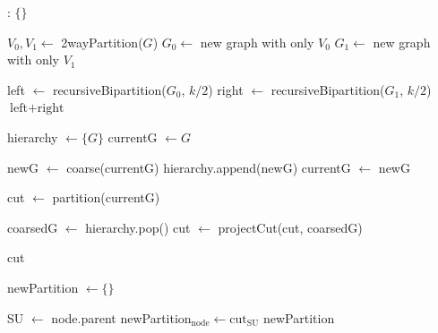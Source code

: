 \documentclass{article}
\begin{document}
\begin{algorithm}
\caption{RB}
\begin{algorithmic}
        :
            \State \Return $\{\}$
        \EndIf
    
        \State $V_0, V_1 \gets$  2wayPartition($G$)
        \State $G_0 \gets$ new graph with only $V_0$
        \State $G_1 \gets$ new graph with only $V_1$

        \State left $\gets$ recursiveBipartition($G_0$, $k/2$)
        \State right $\gets$ recursiveBipartition($G_1$, $k/2$)
        \State \Return $\text{left} + \text{right}$
    \EndFunction
    \Statex

        \State hierarchy $\gets \{G\}$
        \State currentG $\gets G$

            
            \State newG $\gets$ coarse(currentG)
            \State hierarchy.append(newG)
            \State currentG $\gets$ newG
        \EndWhile
        \Statex
    
        \State cut $\gets$ partition(currentG)
        \Statex
        
            \State coarsedG $\gets$ hierarchy.pop()
            \State cut $\gets$ projectCut(cut, coarsedG)
        \EndWhile

        \State \Return cut
    \EndFunction
    \Statex

        \State newPartition $\gets \{\}$
    
            \State SU $\gets$ node.parent 
            \State newPartition$_\text{node} \gets \text{cut}_\text{SU}$
        \EndFor
        \State \Return newPartition
    \EndFunction
\end{algorithmic}
\end{algorithm}


\newpage
\end{document}
